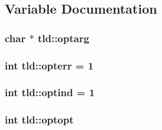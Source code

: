 \subsection{Variable Documentation}
\hypertarget{namespacetld_a1bbc7d3201a2ef41da5495e0e48cfd2e}{
\subsubsection[{optarg}]{\setlength{\rightskip}{0pt plus 5cm}char $\ast$ {\bf tld::optarg}}}
\label{namespacetld_a1bbc7d3201a2ef41da5495e0e48cfd2e}
\hypertarget{namespacetld_a6e180d5067af278cc277ae9c6f7507c1}{
\subsubsection[{opterr}]{\setlength{\rightskip}{0pt plus 5cm}int {\bf tld::opterr} = 1}}
\label{namespacetld_a6e180d5067af278cc277ae9c6f7507c1}
\hypertarget{namespacetld_ab8c5a378ef03678c537edc84a15abc22}{
\subsubsection[{optind}]{\setlength{\rightskip}{0pt plus 5cm}int {\bf tld::optind} = 1}}
\label{namespacetld_ab8c5a378ef03678c537edc84a15abc22}
\hypertarget{namespacetld_a6d6bd80732b9f396bc03e5f2c5cf30f8}{
\subsubsection[{optopt}]{\setlength{\rightskip}{0pt plus 5cm}int {\bf tld::optopt}}}
\label{namespacetld_a6d6bd80732b9f396bc03e5f2c5cf30f8}
